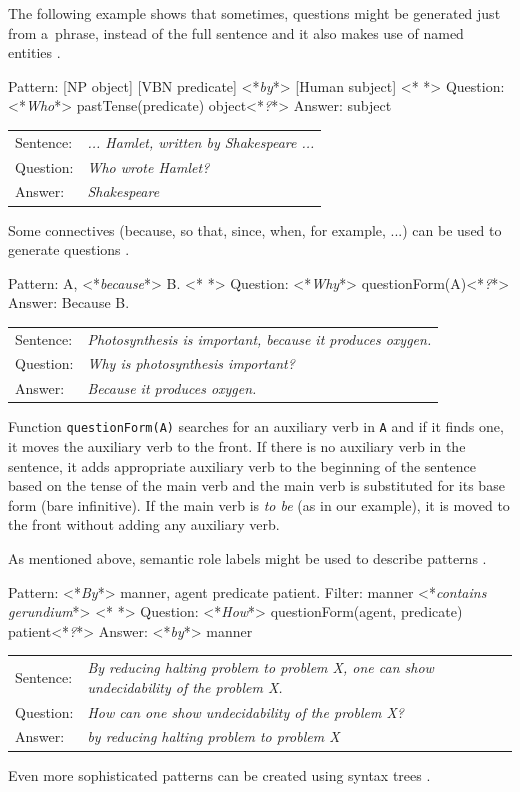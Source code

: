 \documentclass[12pt, twoside]{fithesis2}
\makeatletter
\renewcommand{\_}{\leavevmode \kern0.07em\vbox{\hrule width0.4em}}
\newcommand{\arrowlinesplit}{%
  \noindent\makebox[\linewidth]{\raisebox{0.15em}{\rule{0.478\textwidth}{0.5pt}}%
  ~$\downarrow$~%
  \noindent\raisebox{0.15em}{\rule{0.478\textwidth}{0.5pt}}}%
}
\newcommand{\transformationExample}[3]{%
\vspace{-0.5em}
\noindent %
\begin{tabularx}{\linewidth}{@{} l X @{}}
Sentence: & \emph{#1}\\
Question: & \emph{#2}\\
Answer:   & \emph{#3}\\
  \hline
\end{tabularx}
}
\makeatother
\begin{document}
\noindent
The following example shows that sometimes, questions might be generated just from a~phrase, instead of the full sentence and it also makes use of named entities \cite{mentor}.
\begin{code}
Pattern: [NP object] [VBN predicate] <*\emph{by}*> [Human subject]
<*\arrowlinesplit*>
Question: <*\emph{Who}*> pastTense(predicate) object<*\emph{?}*>
Answer: subject
\end{code}
\transformationExample%
{... Hamlet, written by Shakespeare ...}%
{Who wrote Hamlet?}%
{Shakespeare}

\noindent
Some connectives (because, so that, since, when, for example, ...) can be used to generate questions
\cite{question-gen-connectives, questions-wolfe}.
\begin{code}
Pattern: A, <*\emph{because}*> B.
<*\arrowlinesplit*>
Question: <*\emph{Why}*> questionForm(A)<*\emph{?}*>
Answer: Because B.
\end{code}
\transformationExample%
{Photosynthesis is important, because it produces oxygen.}%
{Why is photosynthesis important?}%
{Because it produces oxygen.}

\noindent
Function \texttt{questionForm(A)} searches for an auxiliary verb in \texttt{A} and if it finds one, it moves the auxiliary verb to the front.
If there is no auxiliary verb in the sentence, it adds appropriate auxiliary verb to the beginning of the sentence based on the tense of the main verb and the main verb is substituted for its base form (bare infinitive).
If the main verb is \emph{to be} (as in our example), it is moved to the front without adding any auxiliary verb.

\noindent
As mentioned above, semantic role labels might be used to describe patterns \cite{question-gen-mannem, questions-eval}.
\begin{code}
Pattern: <*\emph{By}*> manner, agent predicate patient.
Filter: manner <*\emph{contains gerundium}*>
<*\arrowlinesplit*>
Question: <*\emph{How}*> questionForm(agent, predicate) patient<*\emph{?}*>
Answer: <*\emph{by}*> manner
\end{code}
\transformationExample%
{By reducing halting problem to problem X, one can show undecidability of the problem X.}%
{How can one show undecidability of the problem X?}%
{by reducing halting problem to problem X}

\noindent
Even more sophisticated patterns can be created using syntax trees \cite{question-gen-ceist, question-overgenerating-rating}.
\end{document}
